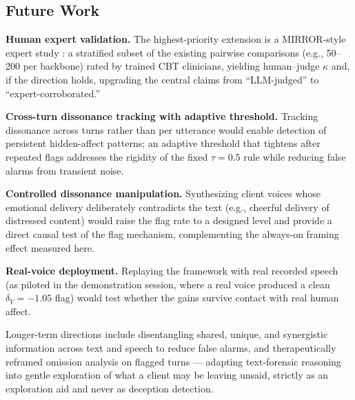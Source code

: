 \subsection{Future Work}

\textbf{Human expert validation.} The highest-priority extension is a MIRROR-style expert study \cite{kim-etal-2025-mirror}: a stratified subset of the existing pairwise comparisons (e.g., 50--200 per backbone) rated by trained CBT clinicians, yielding human--judge $\kappa$ and, if the direction holds, upgrading the central claims from ``LLM-judged'' to ``expert-corroborated.''

\textbf{Cross-turn dissonance tracking with adaptive threshold.} Tracking dissonance across turns rather than per utterance would enable detection of persistent hidden-affect patterns; an adaptive threshold that tightens after repeated flags addresses the rigidity of the fixed $\tau = 0.5$ rule while reducing false alarms from transient noise.

\textbf{Controlled dissonance manipulation.} Synthesizing client voices whose emotional delivery deliberately contradicts the text (e.g., cheerful delivery of distressed content) would raise the flag rate to a designed level and provide a direct causal test of the flag mechanism, complementing the always-on framing effect measured here.

\textbf{Real-voice deployment.} Replaying the framework with real recorded speech (as piloted in the demonstration session, where a real voice produced a clean $\delta_V = -1.05$ flag) would test whether the gains survive contact with real human affect.

Longer-term directions include disentangling shared, unique, and synergistic information across text and speech to reduce false alarms, and therapeutically reframed omission analysis on flagged turns --- adapting text-forensic reasoning into gentle exploration of what a client may be leaving unsaid, strictly as an exploration aid and never as deception detection.
